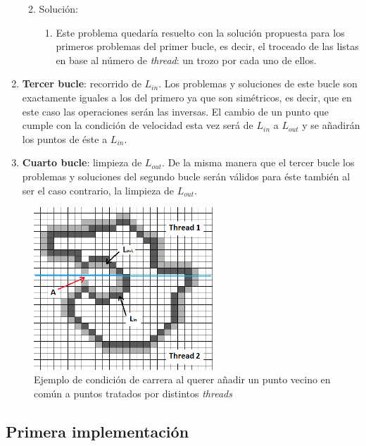 \begin{enumerate}
\begin{enumerate}
\begin{enumerate}
			\end{enumerate}
		\item Soluci\'{o}n: 
			\begin{enumerate}
				\item Este problema quedar\'{i}a resuelto con la soluci\'{o}n propuesta para los primeros problemas del primer bucle, es decir, el troceado de las listas en base al n\'{u}mero de \textit{thread}: un trozo por cada uno de ellos.
			\end{enumerate}
	\end{enumerate}
	\item \textbf{Tercer bucle}: recorrido de $L_{in}$. Los problemas y soluciones de este bucle son exactamente iguales a los del primero ya que son sim\'{e}tricos, es decir, que en este caso las operaciones ser\'{a}n las inversas. El cambio de un punto que cumple con la condici\'{o}n de velocidad esta vez ser\'{a} de $L_{in}$ a $L_{out}$ y se a\~{n}adir\'{a}n los puntos de \'{e}ste a $L_{in}$. 
	\item \textbf{Cuarto bucle}: limpieza de $L_{out}$. De la misma manera que el tercer bucle los problemas y soluciones del segundo bucle ser\'{a}n v\'{a}lidos para \'{e}ste tambi\'{e}n al ser el caso contrario, la limpieza de $L_{out}$.
\end{enumerate}

 \begin{figure}[H]
 	\captionsetup{justification=centering}
 	\centering
 	\includegraphics[width=0.6\textwidth]{./imagenes/mismoVecino}
 	\caption{Ejemplo de condici\'{o}n de carrera al querer a\~{n}adir un punto vecino en com\'{u}n a puntos tratados por distintos \textit{threads}}	
 	\label{mismoVecino}
 \end{figure}

\subsection{Primera implementaci\'{o}n}

